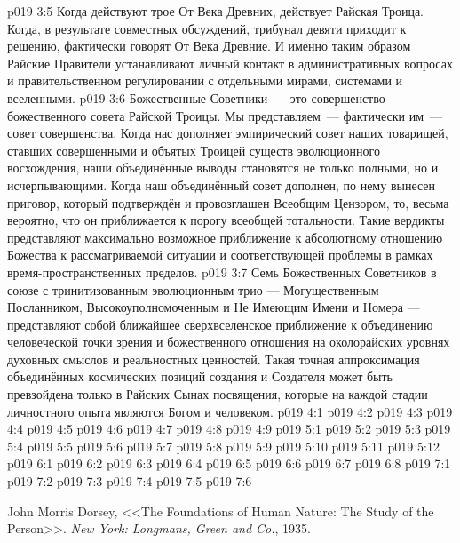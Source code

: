 \vs p019 3:5 Когда действуют трое От Века Древних, действует Райская Троица. Когда, в результате совместных обсуждений, трибунал девяти приходит к решению, фактически говорят От Века Древние. И именно таким образом Райские Правители устанавливают личный контакт в административных вопросах и правительственном регулировании с отдельными мирами, системами и вселенными.
\vs p019 3:6 \pc Божественные Советники~--- это совершенство божественного совета Райской Троицы. Мы представляем~--- фактически  им~--- совет совершенства. Когда нас дополняет эмпирический совет наших товарищей, ставших совершенными и объятых Троицей существ эволюционного восхождения, наши объединённые выводы становятся не только полными, но и исчерпывающими. Когда наш объединённый совет дополнен, по нему вынесен приговор, который подтверждён и провозглашен Всеобщим Цензором, то, весьма вероятно, что он приближается к порогу всеобщей тотальности. Такие вердикты представляют максимально возможное приближение к абсолютному отношению Божества к рассматриваемой ситуации и соответствующей проблемы в рамках время\hyp{}пространственных пределов.
\vs p019 3:7 Семь Божественных Советников в союзе с тринитизованным эволюционным трио --- Могущественным Посланником, Высокоуполномоченным и Не Имеющим Имени и Номера --- представляют собой ближайшее сверхвселенское приближение к объединению человеческой точки зрения и божественного отношения на околорайских уровнях духовных смыслов и реальностных ценностей. Такая точная аппроксимация объединённых космических позиций создания и Создателя может быть превзойдена только в Райских Сынах посвящения, которые на каждой стадии личностного опыта являются Богом и человеком.
\vs p019 4:1 
\vs p019 4:2 
\vs p019 4:3 
\vs p019 4:4 \pc 
\vs p019 4:5 \pc 
\vs p019 4:6 
\vs p019 4:7 
\vs p019 4:8 \pc 
\vs p019 4:9 
\vs p019 5:1 
\vs p019 5:2 
\vs p019 5:3 
\vs p019 5:4 
\vs p019 5:5 \pc 
\vs p019 5:6 
\vs p019 5:7 
\vs p019 5:8 \pc 
\vs p019 5:9 
\vs p019 5:10 
\vs p019 5:11 
\vs p019 5:12 
\vs p019 6:1 
\vs p019 6:2 
\vs p019 6:3 \pc 
\vs p019 6:4 \pc 
\vs p019 6:5 
\vs p019 6:6 
\vs p019 6:7 
\vs p019 6:8 
\vs p019 7:1 
\vs p019 7:2 \pc 
\vs p019 7:3 \pc 
\vs p019 7:4 
\vs p019 7:5 
\vsetoff
\vs p019 7:6 
\quizlink
\begin{thebibliography}{100}
John Morris Dorsey,
{<<The Foundations of Human Nature: The Study of the Person>>.}
{\em New York: Longmans, Green and Co.}, 1935.
\end{thebibliography}
